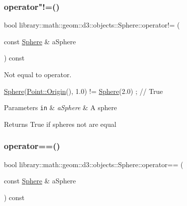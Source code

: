 \subsubsection{\texorpdfstring{operator"!=()}{operator!=()}}
{\footnotesize\ttfamily bool library\+::math\+::geom\+::d3\+::objects\+::\+Sphere\+::operator!= (\begin{DoxyParamCaption}\item[{const \hyperlink{classlibrary_1_1math_1_1geom_1_1d3_1_1objects_1_1_sphere}{Sphere} \&}]{a\+Sphere }\end{DoxyParamCaption}) const}



Not equal to operator. 


\begin{DoxyCode}
\hyperlink{classlibrary_1_1math_1_1geom_1_1d3_1_1objects_1_1_sphere_a55dccc8ea16ee55cd7694c26afa8ea39}{Sphere}(\hyperlink{classlibrary_1_1math_1_1geom_1_1d3_1_1objects_1_1_point_ab2a38e285c562e50bf350272c083986f}{Point::Origin}(), 1.0) != \hyperlink{classlibrary_1_1math_1_1geom_1_1d3_1_1objects_1_1_sphere_a55dccc8ea16ee55cd7694c26afa8ea39}{Sphere}(2.0) ; \textcolor{comment}{// True}
\end{DoxyCode}



\begin{DoxyParams}[1]{Parameters}
\mbox{\tt in}  & {\em a\+Sphere} & A sphere \\
\hline
\end{DoxyParams}
\begin{DoxyReturn}{Returns}
True if spheres not are equal 
\end{DoxyReturn}
\mbox{\label{classlibrary_1_1math_1_1geom_1_1d3_1_1objects_1_1_sphere_ace12dcb88802f002f5797077130c4b98}} 
\subsubsection{\texorpdfstring{operator==()}{operator==()}}
{\footnotesize\ttfamily bool library\+::math\+::geom\+::d3\+::objects\+::\+Sphere\+::operator== (\begin{DoxyParamCaption}\item[{const \hyperlink{classlibrary_1_1math_1_1geom_1_1d3_1_1objects_1_1_sphere}{Sphere} \&}]{a\+Sphere }\end{DoxyParamCaption}) const}



